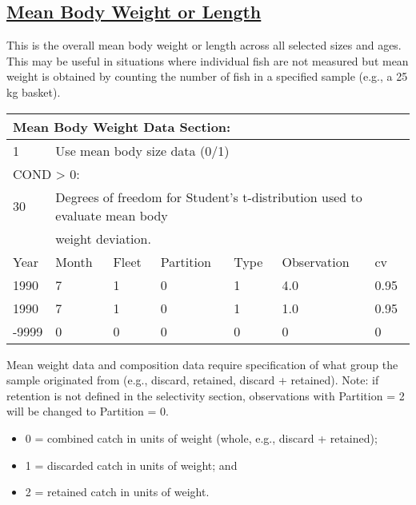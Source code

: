 \hypertarget{MeanBodyWL}{}
\subsection[Mean Body Weight or Length]{\protect\hyperlink{MeanBodyWL}{Mean Body Weight or Length}}
This is the overall mean body weight or length across all selected sizes and ages. This may be useful in situations where individual fish are not measured but mean weight is obtained by counting the number of fish in a specified sample (e.g., a 25 kg basket).    

\begin{center}
	\begin{tabular}{p{1.75cm} p{1.75cm} p{1.75cm} p{1.75cm} p{1.75cm} p{2cm} p{1cm}}
		\multicolumn{7}{l}{Mean Body Weight Data Section:} \\
		\hline
		1  & \multicolumn{6}{l}{Use mean body size data (0/1)} \Tstrut\Bstrut\\
		\hline
		\multicolumn{7}{l}{COND > 0:}\Tstrut\\
		30 & \multicolumn{6}{l}{Degrees of freedom for Student's t-distribution used to evaluate mean body} \\
		  & \multicolumn{6}{l}{weight deviation.} \Bstrut\\
		\hline
		Year & Month & Fleet & Partition & Type & Observation & \gls{cv} \Tstrut\Bstrut\\
		\hline
		1990  & 7 & 1 & 0 & 1 & 4.0 & 0.95 \Tstrut\\
		1990  & 7 & 1 & 0 & 1 & 1.0 & 0.95 \\
		-9999 & 0 & 0 & 0 & 0 & 0   & 0 \Bstrut\\
		\hline
	\end{tabular}
\end{center}

Mean weight data and composition data require specification of what group the sample originated from (e.g., discard, retained, discard + retained).
Note: if retention is not defined in the selectivity section, observations with Partition = 2 will be changed to Partition = 0.
\begin{itemize}
	\item 0 = combined catch in units of weight (whole, e.g., discard + retained);
	\item 1 = discarded catch in units of weight; and
	\item 2 = retained catch in units of weight.
\end{itemize}

